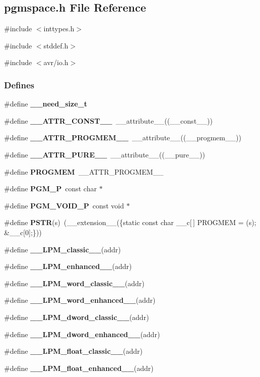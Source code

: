 \subsection{pgmspace.h File Reference}
\label{pgmspace_8h}
{\ttfamily \#include $<$inttypes.h$>$}\par
{\ttfamily \#include $<$stddef.h$>$}\par
{\ttfamily \#include $<$avr/io.h$>$}\par
\subsubsection*{Defines}
\begin{DoxyCompactItemize}
\item 
\#define {\bf \_\-\_\-need\_\-size\_\-t}
\item 
\#define {\bf \_\-\_\-ATTR\_\-CONST\_\-\_\-}~\_\-\_\-attribute\_\-\_\-((\_\-\_\-const\_\-\_\-))
\item 
\#define {\bf \_\-\_\-ATTR\_\-PROGMEM\_\-\_\-}~\_\-\_\-attribute\_\-\_\-((\_\-\_\-progmem\_\-\_\-))
\item 
\#define {\bf \_\-\_\-ATTR\_\-PURE\_\-\_\-}~\_\-\_\-attribute\_\-\_\-((\_\-\_\-pure\_\-\_\-))
\item 
\#define {\bf PROGMEM}~\_\-\_\-ATTR\_\-PROGMEM\_\-\_\-
\item 
\#define {\bf PGM\_\-P}~const char $\ast$
\item 
\#define {\bf PGM\_\-VOID\_\-P}~const void $\ast$
\item 
\#define {\bf PSTR}(s)~(\_\-\_\-extension\_\-\_\-(\{static const char \_\-\_\-c[$\,$] PROGMEM = (s); \&\_\-\_\-c[0];\}))
\item 
\#define {\bf \_\-\_\-LPM\_\-classic\_\-\_\-}(addr)
\item 
\#define {\bf \_\-\_\-LPM\_\-enhanced\_\-\_\-}(addr)
\item 
\#define {\bf \_\-\_\-LPM\_\-word\_\-classic\_\-\_\-}(addr)
\item 
\#define {\bf \_\-\_\-LPM\_\-word\_\-enhanced\_\-\_\-}(addr)
\item 
\#define {\bf \_\-\_\-LPM\_\-dword\_\-classic\_\-\_\-}(addr)
\item 
\#define {\bf \_\-\_\-LPM\_\-dword\_\-enhanced\_\-\_\-}(addr)
\item 
\#define {\bf \_\-\_\-LPM\_\-float\_\-classic\_\-\_\-}(addr)
\item 
\#define {\bf \_\-\_\-LPM\_\-float\_\-enhanced\_\-\_\-}(addr)
\item 

\end{DoxyCompactItemize}
